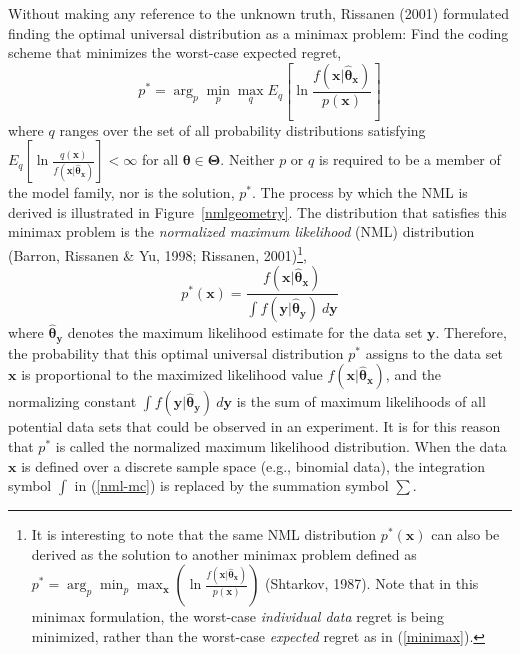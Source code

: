 \documentclass{elsart}
\begin{document}
Without making any reference to the unknown truth, Rissanen (2001) formulated finding the optimal
universal distribution as a minimax problem: Find the coding scheme that minimizes the worst-case
expected regret,
\begin{equation}\label{minimax}
p^* = \displaystyle\arg _{p} \min_{p} \max_{q} E_{q}\left[\ln\frac{\displaystyle f(\bm x
|\hat{\bm\theta}_{\bm x})}{\displaystyle p(\bm x)}\right]
\end{equation}
where $q$ ranges over the set of all probability distributions satisfying $E_{q}\left [ \ln
\frac{q(\bm x)}{f(\bm x |\hat{\bm\theta}_{\bm x})} \right] < \infty$ for all $\bm\theta \in
\bm\Theta$. Neither $p$ or $q$ is required to be a member of the model family, nor is the
solution, $p^*$. The process by which the NML is derived is illustrated in
Figure~\ref{nmlgeometry}. The distribution that satisfies this minimax problem is the
\emph{normalized maximum likelihood} (NML) distribution (Barron, Rissanen \& Yu, 1998; Rissanen,
2001)\footnote{It is interesting to note that the same NML distribution $p^*(\bm x)$ can also be
derived as the solution to another minimax problem defined as $p^* = \displaystyle\arg _{p}
\min_{p} \max_{\bm x } \left(\ln\frac{\displaystyle f(\bm x |\hat{\bm\theta}_{\bm
x})}{\displaystyle p(\bm x)}\right)$ (Shtarkov, 1987). Note that in this minimax formulation, the
worst-case {\it individual data} regret is being minimized, rather than the worst-case {\it
expected} regret as in (\ref{minimax}).},
\begin{equation}\label{nml-mc}
p^*(\bm x) = \frac{f(\bm x |\hat{\bm\theta}_{\bm x})}
{\int  f(\bm{y}|\hat{\bm{\theta}}_{\bm{y}}) \ d\bm{y}}
\end{equation}
where $\hat{\bm{\theta}}_{\bm{y}}$ denotes the maximum likelihood estimate for the data set
$\bm{y}$. Therefore, the probability that this optimal universal distribution $p^*$ assigns to the
data set $\bm x$ is proportional to the maximized likelihood value $f(\bm x
|\hat{\bm\theta}_{\bm{x}})$, and the normalizing constant $\int
f(\bm{y}|\hat{\bm{\theta}}_{\bm{y}}) \ d\bm{y}$  is the sum of maximum likelihoods of all
potential data sets that could be observed in an experiment. It is for this reason that $p^*$ is
called the normalized maximum likelihood distribution. When the data $\bm x$ is defined over a
discrete sample space (e.g., binomial data), the integration symbol $\int$ in (\ref{nml-mc}) is
replaced by the summation symbol $\sum$.\
\end{document}

